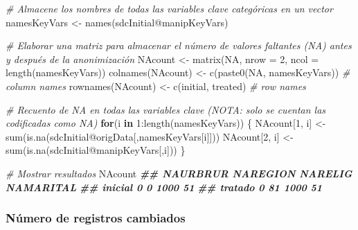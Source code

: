 \documentclass[
]{book}
\newenvironment{Shaded}{\begin{snugshade}}{\end{snugshade}}
\newcommand{\AttributeTok}[1]{\textcolor[rgb]{0.77,0.63,0.00}{#1}}
\newcommand{\CommentTok}[1]{\textcolor[rgb]{0.56,0.35,0.01}{\textit{#1}}}
\newcommand{\ConstantTok}[1]{\textcolor[rgb]{0.00,0.00,0.00}{#1}}
\newcommand{\ControlFlowTok}[1]{\textcolor[rgb]{0.13,0.29,0.53}{\textbf{#1}}}
\newcommand{\DecValTok}[1]{\textcolor[rgb]{0.00,0.00,0.81}{#1}}
\newcommand{\DocumentationTok}[1]{\textcolor[rgb]{0.56,0.35,0.01}{\textbf{\textit{#1}}}}
\newcommand{\FunctionTok}[1]{\textcolor[rgb]{0.00,0.00,0.00}{#1}}
\newcommand{\NormalTok}[1]{#1}
\newcommand{\OtherTok}[1]{\textcolor[rgb]{0.56,0.35,0.01}{#1}}
\newcommand{\SpecialCharTok}[1]{\textcolor[rgb]{0.00,0.00,0.00}{#1}}
\newcommand{\StringTok}[1]{\textcolor[rgb]{0.31,0.60,0.02}{#1}}
\theoremstyle{definition}
\theoremstyle{definition}
\theoremstyle{definition}
\theoremstyle{definition}
\theoremstyle{remark}
\begin{document}
\begin{Shaded}
\begin{Highlighting}[]
\CommentTok{\# Almacene los nombres de todas las variables clave categóricas en un vector}
\NormalTok{namesKeyVars }\OtherTok{\textless{}{-}} \FunctionTok{names}\NormalTok{(sdcInitial}\SpecialCharTok{@}\NormalTok{manipKeyVars)}

\CommentTok{\# Elaborar una matriz para almacenar el número de valores faltantes (NA) antes y después de la anonimización}
\NormalTok{NAcount }\OtherTok{\textless{}{-}} \FunctionTok{matrix}\NormalTok{(}\ConstantTok{NA}\NormalTok{, }\AttributeTok{nrow =} \DecValTok{2}\NormalTok{, }\AttributeTok{ncol =} \FunctionTok{length}\NormalTok{(namesKeyVars))}
\FunctionTok{colnames}\NormalTok{(NAcount) }\OtherTok{\textless{}{-}} \FunctionTok{c}\NormalTok{(}\FunctionTok{paste0}\NormalTok{(}\StringTok{\textquotesingle{}NA\textquotesingle{}}\NormalTok{, namesKeyVars)) }\CommentTok{\# column names}
\FunctionTok{rownames}\NormalTok{(NAcount) }\OtherTok{\textless{}{-}} \FunctionTok{c}\NormalTok{(}\StringTok{\textquotesingle{}initial\textquotesingle{}}\NormalTok{, }\StringTok{\textquotesingle{}treated\textquotesingle{}}\NormalTok{) }\CommentTok{\# row names}

\CommentTok{\# Recuento de NA en todas las variables clave (NOTA: solo se cuentan las codificadas como NA)}
\ControlFlowTok{for}\NormalTok{(i }\ControlFlowTok{in} \DecValTok{1}\SpecialCharTok{:}\FunctionTok{length}\NormalTok{(namesKeyVars)) \{}
\NormalTok{  NAcount[}\DecValTok{1}\NormalTok{, i] }\OtherTok{\textless{}{-}} \FunctionTok{sum}\NormalTok{(}\FunctionTok{is.na}\NormalTok{(sdcInitial}\SpecialCharTok{@}\NormalTok{origData[,namesKeyVars[i]]))}
\NormalTok{  NAcount[}\DecValTok{2}\NormalTok{, i] }\OtherTok{\textless{}{-}} \FunctionTok{sum}\NormalTok{(}\FunctionTok{is.na}\NormalTok{(sdcInitial}\SpecialCharTok{@}\NormalTok{manipKeyVars[,i]))}
\NormalTok{\}}

\CommentTok{\# Mostrar resultados}
\NormalTok{NAcount}
\DocumentationTok{\#\# NAURBRUR NAREGION NARELIG NAMARITAL}
\DocumentationTok{\#\# inicial 0 0 1000 51}
\DocumentationTok{\#\# tratado 0 81 1000 51}
\end{Highlighting}
\end{Shaded}

\hypertarget{nuxfamero-de-registros-cambiados}{%
\subsubsection{Número de registros cambiados}\label{nuxfamero-de-registros-cambiados}}
\end{document}
